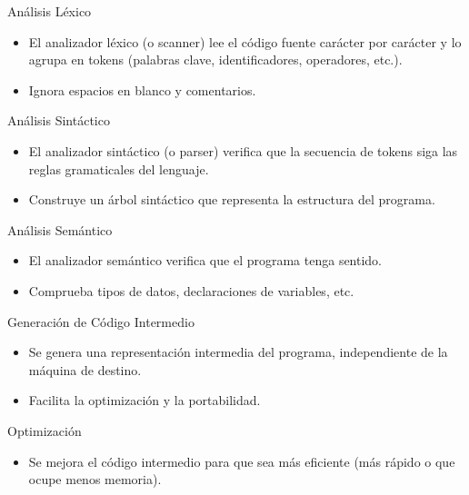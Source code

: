 \documentclass{beamer}
\begin{document}
	\begin{frame}{Análisis Léxico}
		
		\begin{itemize}
			\item El analizador léxico (o scanner) lee el código fuente carácter por carácter y lo agrupa en tokens (palabras clave, identificadores, operadores, etc.).
			\item Ignora espacios en blanco y comentarios.
		\end{itemize}
		
	\end{frame}
	
	\begin{frame}{Análisis Sintáctico}
		
		\begin{itemize}
			\item El analizador sintáctico (o parser) verifica que la secuencia de tokens siga las reglas gramaticales del lenguaje.
			\item Construye un árbol sintáctico que representa la estructura del programa.
		\end{itemize}
		
	\end{frame}
	
	\begin{frame}{Análisis Semántico}
		
		\begin{itemize}
			\item El analizador semántico verifica que el programa tenga sentido.
			\item Comprueba tipos de datos, declaraciones de variables, etc.
		\end{itemize}
		
	\end{frame}
	
	\begin{frame}{Generación de Código Intermedio}
		
		\begin{itemize}
			\item Se genera una representación intermedia del programa, independiente de la máquina de destino.
			\item Facilita la optimización y la portabilidad.
		\end{itemize}
		
	\end{frame}
	
	\begin{frame}{Optimización}
		
		\begin{itemize}
			\item Se mejora el código intermedio para que sea más eficiente (más rápido o que ocupe menos memoria).
		\end{itemize}
		
	\end{frame}
	
\end{document}
